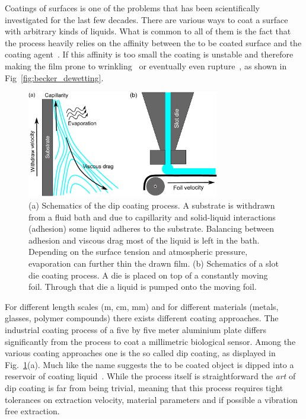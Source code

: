 Coatings of surfaces is one of the problems that has been scientifically investigated for the last few decades.
There are various ways to coat a surface with arbitrary kinds of liquids.
What is common to all of them is the fact that the process heavily relies on the affinity between the to be coated surface and the coating agent~\cite{bonnWettingSpreading2009}.
If this affinity is too small the coating is unstable and therefore making the film prone to wrinkling~\cite{dasilvasobrinhoStudyDefectsUltrathin1999} or eventually even rupture~\cite{oronLongscaleEvolutionThin1997, crasterDynamicsStabilityThin2009, beckerComplexDewettingScenarios2003}, as shown in Fig~\ref{fig:becker_dewetting}.

\begin{figure}
    \centering
    \includegraphics[width=0.75\textwidth]{graphics/Coating_intro.pdf}
    \caption{(a) Schematics of the dip coating process. 
    A substrate is withdrawn from a fluid bath and due to capillarity and solid-liquid interactions (adhesion) some liquid adheres to the substrate.
    Balancing between adhesion and viscous drag most of the liquid is left in the bath.
    Depending on the surface tension and atmospheric pressure, evaporation can further thin the drawn film.
    (b) Schematics of a slot die coating process.
    A die is placed on top of a constantly moving foil.
    Through that die a liquid is pumped onto the moving foil.}
    \label{fig:dip_coating}
\end{figure}
For different length scales (m, cm, mm) and for different materials (metals, glasses, polymer compounds) there exists different coating approaches.
The industrial coating process of a five by five meter aluminium plate differs significantly from the process to coat a millimetric biological sensor.
Among the various coating approaches one is the so called dip coating, as displayed in Fig.~\ref{fig:dip_coating}(a). 
Much like the name suggests the to be coated object is dipped into a reservoir of coating liquid~\cite{scrivenPhysicsApplicationsDIP1988, darhuberSelectiveDipcoatingChemically2000, grossoHowExploitFull2011}.
While the process itself is straightforward the \textit{art} of dip coating is far from being trivial, meaning that this process requires tight tolerances on extraction velocity, material parameters and if possible a vibration free extraction.

